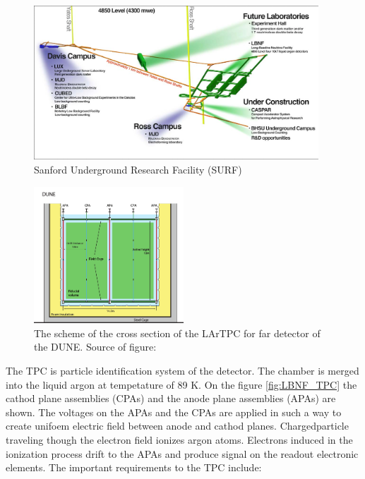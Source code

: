 \begin{figure}
\caption{Sanford Underground Research Facility (SURF)}
\label{fig:farDetector_SURF2}
\centering
\includegraphics[width=0.95\textwidth, keepaspectratio=true]{figs/farDetector_wholeLab.png}
\end{figure}

\begin{figure}
\caption{The scheme of the cross section of the LArTPC for far detector of the DUNE. Source of figure: \cite{ref_LBNFdoc_volume-detectors}}
\label{fig:farDetector_TPC}
\centering
\includegraphics[width=0.50\textwidth, keepaspectratio=true]{figs/farDetector_TPC.png}
\end{figure}

The TPC is particle identification system of the detector. The chamber is merged into the liquid argon at tempetature of 89 K. On the figure \ref{fig:LBNF_TPC} the cathod plane assemblies (CPAs) and the anode plane assemblies (APAs) are shown. The voltages on the APAs and the CPAs are applied in such a way to create unifoem electric field between anode and cathod planes. Chargedparticle traveling though the electron field ionizes argon atoms. Electrons induced in the ionization process drift to the APAs and produce signal on the readout electronic elements.
The important requirements to the TPC include:

